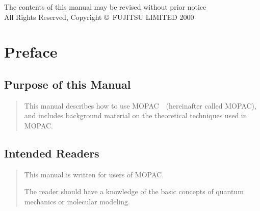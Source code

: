 \maketitle
\begin{latexonly}
\begin{copyrightnotice}
The contents of this manual may be revised without prior notice\\
All Rights Reserved, Copyright \copyright\ FUJITSU LIMITED 2000
\end{copyrightnotice}
\newpage
\end{latexonly}
\begin{htmlonly}
\begin{center}
\end{center}
\end{htmlonly}
\chapter*{Preface}
\section*{Purpose of this Manual}
\begin{quote}
This manual describes how to use MOPAC~\mopacversion\ (hereinafter called
MOPAC), and includes background material on the theoretical techniques used in
MOPAC.
\end{quote}
\section*{Intended Readers}
\begin{quote}
This manual is written for users of MOPAC.

The reader should have a knowledge of the basic concepts of quantum mechanics
or molecular modeling.
\end{quote}
